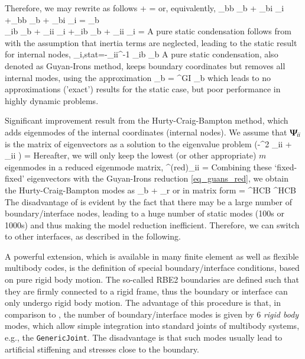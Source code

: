 Therefore, we may rewrite  as follows
\be \label{eq_GuyanIrons}
	  +   =   
\ee
or, equivalently,
\bea
	\Mm_{bb} \ddot{\qv}_b + \Mm_{bi} \ddot{\qv}_i +\Km_{bb}  {\qv}_b + \Km_{bi}  {\qv}_i  = {\fv}_b \label{eq_Guyan_bb}\\
	\Mm_{ib} \ddot{\qv}_b + \Mm_{ii} \ddot{\qv}_i +\Km_{ib}  {\qv}_b + \Km_{ii}  {\qv}_i  = \Null \eqDot \label{eq_Guyan_ii}
\eea
A pure static condensation follows from  with the assumption that inertia terms are neglected,
leading to the static result for internal nodes,
\be 
	{\qv}_{i,stat}=-\Km_{ii}^{-1} \Km_{ib} {\qv}_{b} \eqDot 
\ee
A pure static condensation, also denoted as Guyan-Irons method, keeps boundary coordinates but removes all internal modes, using the approximation
\be
	\label{eq_guans_red}
	 \approx {}  \qv_b = \tPsi^{GI} \qv_b \eqComma
\ee
which leads to no approximations ('exact') results for the static case, but poor performance in highly dynamic problems.

Significant improvement result from the Hurty-Craig-Bampton method, which adds eigenmodes of the internal coordinates (internal nodes).
We assume that $\mbox{\boldmath $\Psi$ \unboldmath}\!\!_{ii}$ is the matrix of eigenvectors as a solution to the eigenvalue problem
\be \label{theory:eigenmodes:GEPii}
	\left(-\omega^2 \Mm_{ii} + \Km_{ii} \right) \vv = \Null \eqComma
\ee
Hereafter, we will only keep the lowest (or other appropriate) $m$ eigenmodes in a reduced eigenmode matrix,
\be
  \tPsi^{(red)}_{ii} = 
\ee
Combining these `fixed-fixed' eigenvectors with the Guyan-Irons reduction \eqref{eq_guans_red}, we obtain the 
Hurty-Craig-Bampton modes as
\be
	 \approx {}  \qv_b  +    \pv_{r} \eqComma
\ee
or in matrix form
\be \label{theory:eigenmodes:HCB}
	 \approx {}    = \tPsi^{HCB} \pv^{HCB} \eqDot
\ee
The disadvantage of  is evident by the fact that there may be a large number of boundary/interface nodes, leading to a huge number of static modes (100s or 1000s) and thus making the model reduction inefficient. Therefore, we can switch to other interfaces, as described in the following.

A powerful extension, which is available in many finite element as well as flexible multibody codes, is the definition of special boundary/interface conditions, based on pure rigid body motion.
The so-called RBE2 boundaries are defined such that they are firmly connected to a rigid frame, thus the boundary or interface can only undergo rigid body motion.
The advantage of this procedure is that, in comparison to , the number of boundary/interface modes is given by 6 {\it rigid body} modes, which allow simple integration into standard joints of multibody systems, e.g., the \texttt{GenericJoint}.
The disadvantage is that such modes usually lead to artificial stiffening and stresses close to the boundary.


